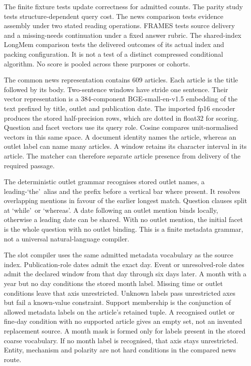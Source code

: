 The finite fixture tests update correctness for admitted counts.
The parity study tests structure-dependent query cost.
The news comparison tests evidence assembly under two stated reading operations.
FRAMES tests source delivery and a missing-needs continuation under a fixed answer rubric.
The shared-index LongMem comparison tests the delivered outcomes of its actual index and packing configuration.
It is not a test of a distinct compressed conditional algorithm.
No score is pooled across these purposes or cohorts.

The common news representation contains 609 articles.
Each article is the title followed by its body.
Two-sentence windows have stride one sentence.
Their vector representation is a 384-component BGE-small-en-v1.5 embedding of the text prefixed by title, outlet and publication date.
The imported fp16 encoder produces the stored half-precision rows, which are dotted in float32 for scoring.
Question and facet vectors use its query role.
Cosine compares unit-normalised vectors in this same space.
A document identity names the article, whereas an outlet label can name many articles.
A window retains its character interval in its article.
The matcher can therefore separate article presence from delivery of the required passage.

The deterministic outlet grammar recognises stored outlet names, a leading-\lq the\rq\ alias and the prefix before a vertical bar where present.
It resolves overlapping mentions in favour of the earlier longest match.
Question clauses split at \lq while\rq\ or \lq whereas\rq.
A date following an outlet mention binds locally, otherwise a leading date can be shared.
With no outlet mention, the initial facet is the whole question with no outlet binding.
This is a finite metadata grammar, not a universal natural-language compiler.

The slot compiler uses the same admitted metadata vocabulary as the source index.
Publication-role dates admit the exact day.
Event or unresolved-role dates admit the declared window from that day through six days later.
A month with a year but no day conditions the stored month label.
Missing time or outlet conditions leave that axis unrestricted.
Unknown labels pass unrestricted axes but fail a known-value constraint.
Support membership is the conjunction of allowed metadata labels on the article's retained tuple.
A recognised outlet or fine-day condition with no supported article gives an empty set, not an invented replacement source.
A month mask is formed only for labels present in the stored coarse vocabulary.
If no month label is recognised, that axis stays unrestricted.
Entity, mechanism and polarity are not hard conditions in the compared news route.

